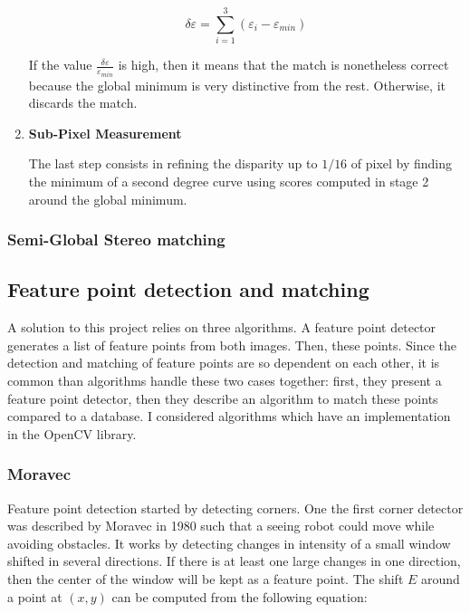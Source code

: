 \documentclass[12pt]{article}
\begin{document}
\begin{enumerate}
\begin{equation}
  \delta \varepsilon = \sum_{i=1}^{3} (\varepsilon_i - \varepsilon_{min}) 
\end{equation}

If the value $\frac{\delta \varepsilon}{\varepsilon_{min}}$ is high, then it means that the match is nonetheless correct because the global minimum is very distinctive from the rest. Otherwise, it discards the match.

  \item \textbf{Sub-Pixel Measurement}

The last step consists in refining the disparity up to $1/16$ of pixel by finding the minimum of a second degree curve using scores computed in stage 2 around the global minimum.
\end{enumerate}

\subsubsection{Semi-Global Stereo matching}



\subsection{Feature point detection and matching}
A solution to this project relies on three algorithms. A feature point detector generates a list of feature points from both images. Then, these points. Since the detection and matching of feature points are so dependent on each other, it is common than algorithms handle these two cases together: first, they present a feature point detector, then they describe an algorithm to match these points compared to a database. I considered algorithms which have an implementation in the OpenCV library.

\subsubsection{Moravec}
Feature point detection started by detecting corners. One the first corner detector was described by Moravec in 1980\cite{Moravec80} such that a seeing robot could move while avoiding obstacles. It works by detecting changes in intensity of a small window shifted in several directions. If there is at least one large changes in one direction, then the center of the window will be kept as a feature point. The shift $E$ around a point at $(x,y)$ can be computed from the following equation:
\end{document}
